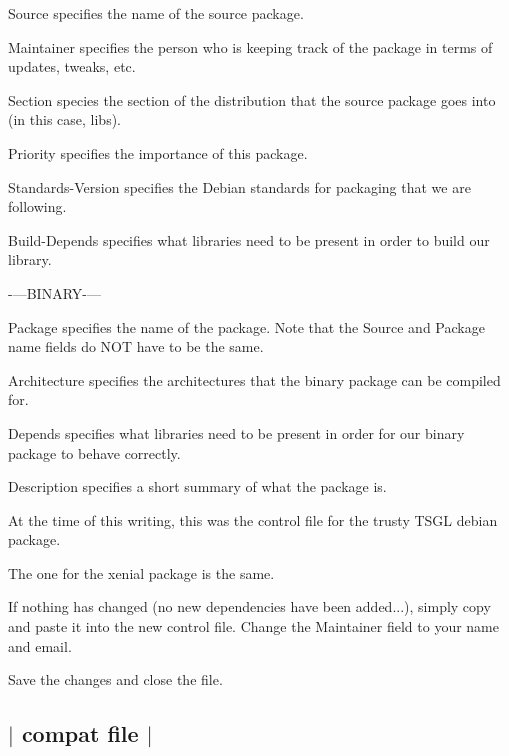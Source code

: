 \begin{DoxyItemize}
\item {\ttfamily Source} specifies the name of the source package.
\item {\ttfamily Maintainer} specifies the person who is keeping track of the package in terms of updates, tweaks, etc.
\item {\ttfamily Section} species the section of the distribution that the source package goes into (in this case, libs).
\item {\ttfamily Priority} specifies the importance of this package.
\item {\ttfamily Standards-\/\-Version} specifies the Debian standards for packaging that we are following.
\item {\ttfamily Build-\/\-Depends} specifies what libraries need to be present in order to build our library.
\end{DoxyItemize}

-\/---B\-I\-N\-A\-R\-Y-\/---


\begin{DoxyItemize}
\item {\ttfamily Package} specifies the name of the package. Note that the Source and Package name fields do N\-O\-T have to be the same.
\item {\ttfamily Architecture} specifies the architectures that the binary package can be compiled for.
\item {\ttfamily Depends} specifies what libraries need to be present in order for our binary package to behave correctly.
\item {\ttfamily Description} specifies a short summary of what the package is.
\end{DoxyItemize}

At the time of this writing, this was the control file for the {\ttfamily trusty} T\-S\-G\-L debian package.

The one for the {\ttfamily xenial} package is the same.

If nothing has changed (no new dependencies have been added...), simply copy and paste it into the new control file. Change the {\ttfamily Maintainer} field to your name and email.

Save the changes and close the file. 

 \subsection*{$\vert$ compat file $\vert$ }


